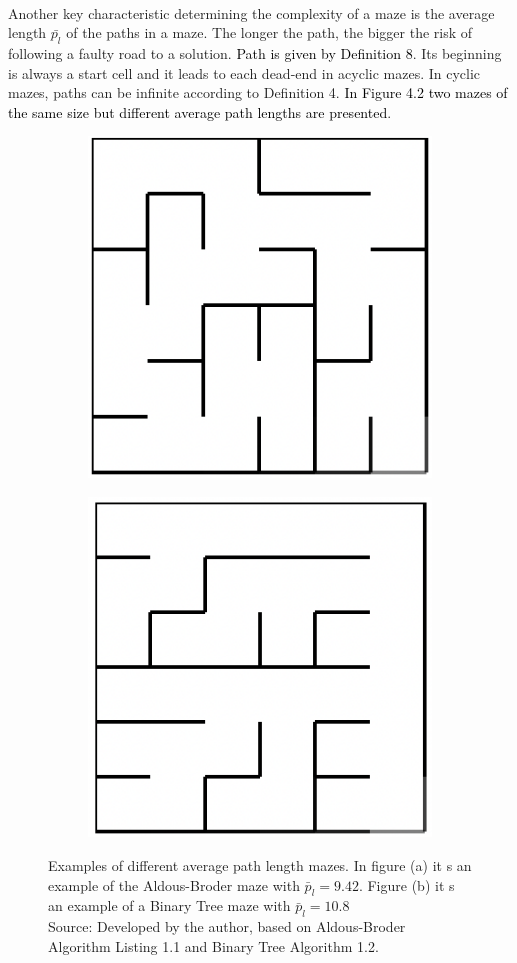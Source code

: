 \newline
\newline
\\
Another key characteristic determining the complexity of a maze is the average length $\bar{p_l}$ of the paths in a maze. The longer the path, the bigger
the risk of following a faulty road to a solution. \textcolor{black}{Path is given by Definition 8}. Its beginning is always a start cell and it leads to
each dead-end in acyclic mazes. In cyclic mazes, paths can be infinite according to Definition 4. \textcolor{black}{In Figure 4.2 two mazes of the same size
but different average path lengths are presented}.
\newline
\begin{figure}[!h]
\centering
\begin{subfigure}{.5\textwidth}
\centering
\includegraphics[width=.5\linewidth]{aldous}
\caption{}
\label{fig:sub1}
\end{subfigure}%
\begin{subfigure}{.5\textwidth}
\centering
\includegraphics[width=.5\linewidth]{binary}
\caption{}
\label{fig:sub2}
\end{subfigure}
\caption{Examples of different average path length mazes. In figure (a) it s an example of the Aldous-Broder maze with $\bar{p}_l = 9.42$. Figure (b) it s an example of a Binary Tree maze with $\bar{p}_l = 10.8$\\ Source: Developed by the author,  based on Aldous-Broder Algorithm Listing 1.1 and Binary Tree Algorithm 1.2. }
\label{fig:test}
\end{figure}
